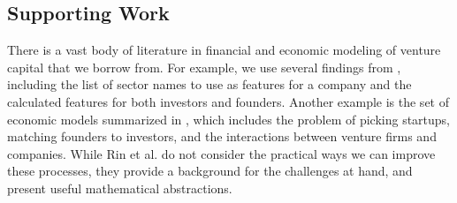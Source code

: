 \subsection{Supporting Work}

There is a vast body of literature in financial and economic modeling of venture capital that we borrow from. For example, we use several findings from \cite{2017arXiv170604229H}, including the list of sector names to use as features for a company and the calculated features for both investors and founders. Another example is the set of economic models summarized in \cite{venture-survey}, which includes the problem of picking startups, matching founders to investors, and the interactions between venture firms and companies. While Rin et al. do not consider the practical ways we can improve these processes, they provide a background for the challenges at hand, and present useful mathematical abstractions.
